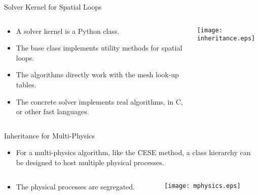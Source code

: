 \documentclass[dvips,xcolor=pst,14pt]{beamer}
\begin{document}
\begin{frame}{
%
Solver Kernel for Spatial Loops
%
}
\begin{columns}[c]
\begin{column}{.75\textwidth}
\begin{itemize}
  \item A solver kernel is a Python class.
  \item The base class implements utility methods for \alert{spatial loops}.
  \item The algorithms directly work with the mesh look-up tables.
  \item The concrete solver implements real algorithms, in \alert{C}, or other
  fast languages.
\end{itemize}
\end{column}
\begin{column}{.25\textwidth} \centering
  \texttt{[image: inheritance.eps]}
\end{column}
\end{columns}
\end{frame}

\begin{frame}{
%
Inheritance for Multi-Physics
%
}
\begin{itemize}
  \item For a multi-physics algorithm, like the CESE method, a class hierarchy
  can be designed to host multiple physical processes.
\end{itemize}
\begin{columns}[c]
\begin{column}{.5\textwidth}
\begin{itemize}
  \item The physical processes are segregated.
\end{itemize}
\end{column}
\begin{column}{.5\textwidth} \centering
  \texttt{[image: mphysics.eps]}
\end{column}
\end{columns}
\end{frame}
\end{document}
